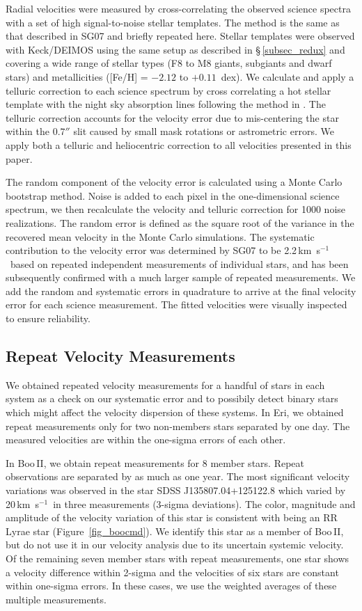 \documentclass{../tex_files/emulateapj}
\newcommand{\kms}{\,km~s$^{-1}$}
\begin{document}
Radial velocities were measured by cross-correlating the observed
science spectra with a set of high signal-to-noise stellar templates.
The method is the same as that described in SG07 and briefly repeated
here.  Stellar templates were observed with Keck/DEIMOS using the same
setup as described in \S\,\ref{subsec_redux} and covering a wide range
of stellar types (F8 to M8 giants, subgiants and dwarf stars) and
metallicities ([Fe/H] = $-2.12$ to $+0.11$~dex).  We calculate and
apply a telluric correction to each science spectrum by cross
correlating a hot stellar template with the night sky absorption lines
following the method in \citet{sohn06a}.  The telluric correction
accounts for the velocity error due to mis-centering the star within
the $0.7''$ slit caused by small mask rotations or astrometric errors.
We apply both a telluric and heliocentric correction to all velocities
presented in this paper.


The random component of the velocity error is calculated using a Monte
Carlo bootstrap method.  Noise is added to each pixel in the
one-dimensional science spectrum, we then recalculate the velocity and
telluric correction for 1000 noise realizations.  The random error is
defined as the square root of the variance in the recovered mean
velocity in the Monte Carlo simulations.  The systematic contribution
to the velocity error was determined by SG07 to be 2.2\kms\ based on
repeated independent measurements of individual stars, and has been
subsequently confirmed with a much larger sample of repeated
measurements.  We add the random and systematic errors in quadrature
to arrive at the final velocity error for each science measurement.
The fitted velocities were visually inspected to ensure reliability.


\subsection{Repeat Velocity Measurements}

We obtained repeated velocity measurements for a handful of stars in
each system as a check on our systematic error and to possibily detect binary
stars which might affect the velocity dispersion of these systems.  In
Eri, we obtained repeat measurements only for two non-members stars
separated by one day.  The measured velocities are within the
one-sigma errors of each other.


In Boo\,II, we obtain repeat measurements for 8 member stars.  Repeat
observations are separated by as much as one year.  The most
significant velocity variations was observed in the star SDSS
J135807.04+125122.8 which varied by 20\kms\ in three measurements
(3-sigma deviations).  The color, magnitude and amplitude of the
velocity variation of this star is consistent with being an RR Lyrae
star (Figure~\ref{fig_boocmd}).  We identify this star as a member of
Boo\,II, but do not use it in our velocity analysis due to its
uncertain systemic velocity.  Of the remaining seven member stars with
repeat measurements, one star shows a velocity difference within
2-sigma and the velocities of six stars are constant within one-sigma
errors.  In these cases, we use the weighted averages of these
multiple measurements.
\end{document}
